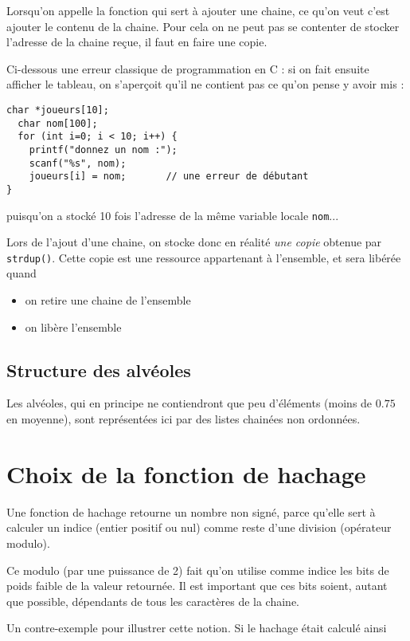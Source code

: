 Lorsqu'on appelle la fonction qui sert à ajouter une chaine, ce qu'on
veut c'est ajouter le contenu de la chaine.  Pour cela on ne peut pas
se contenter de stocker l'adresse de la chaine reçue, il faut en faire
une copie.

Ci-dessous une erreur classique de programmation en C : si on fait
ensuite afficher le tableau, on s'aperçoit qu'il ne contient pas ce
qu'on pense y avoir mis :

\begin{lstlisting}[style=cextract]
  char *joueurs[10];
  char nom[100];
  for (int i=0; i < 10; i++) {
    printf("donnez un nom :");
    scanf("%s", nom);
    joueurs[i] = nom;       // une erreur de débutant
}
\end{lstlisting}

puisqu'on a stocké 10 fois l'adresse de la même variable locale \texttt{nom}...

Lors de l'ajout d'une chaine, on stocke donc en réalité \emph{une
  copie} obtenue par \texttt{strdup()}. Cette copie est une ressource
appartenant à l'ensemble, et sera libérée quand
\begin{itemize}
\item on retire une chaine de l'ensemble
\item on libère l'ensemble
\end{itemize}

\subsection{Structure des alvéoles}

Les alvéoles, qui en principe ne contiendront que peu d'éléments
(moins de $0.75$ en moyenne), sont représentées ici par des listes
chainées non ordonnées.


\section{Choix de la fonction de hachage}

Une fonction de hachage retourne un nombre non signé, parce qu'elle
sert à calculer un indice (entier positif ou nul) comme reste d'une
division (opérateur modulo).

Ce modulo (par une puissance de 2) fait qu'on utilise comme indice
les bits de poids faible de la valeur retournée. Il est important que
ces bits soient, autant que possible, dépendants de tous les caractères de la chaine.

Un contre-exemple pour illustrer cette notion. Si le hachage était calculé
ainsi

